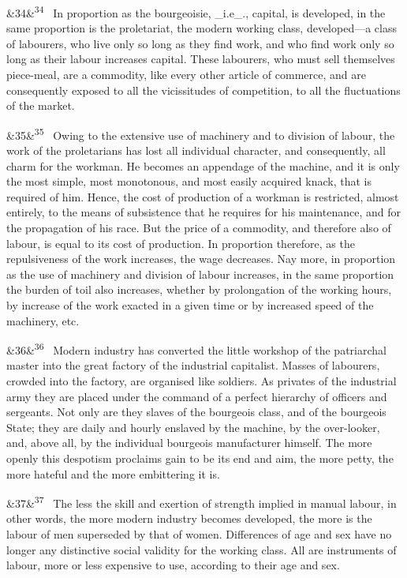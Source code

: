 \documentclass[12pt]{article}
\newcommand{\para}[1][]{\par\noindent\ifx&#1&\else\textsuperscript{\footnotesize #1}~\fi}
\begin{document}
\para[34] In proportion as the bourgeoisie, \_i.e\_., capital, is developed, in the same proportion is the proletariat, the modern working class, developed---a class of labourers, who live only so long as they find work, and who find work only so long as their labour increases capital. These labourers, who must sell themselves piece-meal, are a commodity, like every other article of commerce, and are consequently exposed to all the vicissitudes of competition, to all the fluctuations of the market.

\para[35] Owing to the extensive use of machinery and to division of labour, the work of the proletarians has lost all individual character, and consequently, all charm for the workman. He becomes an appendage of the machine, and it is only the most simple, most monotonous, and most easily acquired knack, that is required of him. Hence, the cost of production of a workman is restricted, almost entirely, to the means of subsistence that he requires for his maintenance, and for the propagation of his race. But the price of a commodity, and therefore also of labour, is equal to its cost of production. In proportion therefore, as the repulsiveness of the work increases, the wage decreases. Nay more, in proportion as the use of machinery and division of labour increases, in the same proportion the burden of toil also increases, whether by prolongation of the working hours, by increase of the work exacted in a given time or by increased speed of the machinery, etc.

\para[36] Modern industry has converted the little workshop of the patriarchal master into the great factory of the industrial capitalist. Masses of labourers, crowded into the factory, are organised like soldiers. As privates of the industrial army they are placed under the command of a perfect hierarchy of officers and sergeants. Not only are they slaves of the bourgeois class, and of the bourgeois State; they are daily and hourly enslaved by the machine, by the over-looker, and, above all, by the individual bourgeois manufacturer himself. The more openly this despotism proclaims gain to be its end and aim, the more petty, the more hateful and the more embittering it is.

\para[37] The less the skill and exertion of strength implied in manual labour, in other words, the more modern industry becomes developed, the more is the labour of men superseded by that of women. Differences of age and sex have no longer any distinctive social validity for the working class. All are instruments of labour, more or less expensive to use, according to their age and sex.
\end{document}
